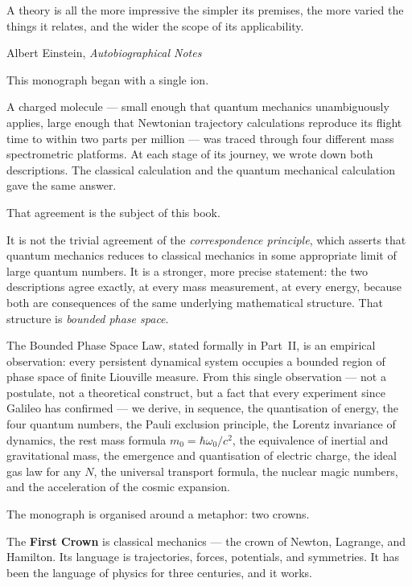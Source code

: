 
\epigraph{%
  A theory is all the more impressive the simpler its premises,
  the more varied the things it relates,
  and the wider the scope of its applicability.%
}{Albert Einstein, \textit{Autobiographical Notes}}

This monograph began with a single ion.

A charged molecule --- small enough that quantum mechanics unambiguously applies,
large enough that Newtonian trajectory calculations reproduce its flight time
to within two parts per million --- was traced through four different mass
spectrometric platforms.
At each stage of its journey, we wrote down both descriptions.
The classical calculation and the quantum mechanical calculation gave the same
answer.

That agreement is the subject of this book.

It is not the trivial agreement of the \emph{correspondence principle}, which
asserts that quantum mechanics reduces to classical mechanics in some appropriate
limit of large quantum numbers.
It is a stronger, more precise statement: the two descriptions agree exactly,
at every mass measurement, at every energy, because both are consequences of
the same underlying mathematical structure.
That structure is \emph{bounded phase space}.

The Bounded Phase Space Law, stated formally in Part~II, is an empirical
observation: every persistent dynamical system occupies a bounded region of
phase space of finite Liouville measure.
From this single observation --- not a postulate, not a theoretical construct,
but a fact that every experiment since Galileo has confirmed --- we derive, in
sequence, the quantisation of energy, the four quantum numbers, the Pauli
exclusion principle, the Lorentz invariance of dynamics, the rest mass formula
$m_0 = \hbar\omega_0/c^2$, the equivalence of inertial and gravitational mass,
the emergence and quantisation of electric charge, the ideal gas law for any $N$,
the universal transport formula, the nuclear magic numbers, and
the acceleration of the cosmic expansion.

The monograph is organised around a metaphor: two crowns.

The \textbf{First Crown} is classical mechanics --- the crown of Newton,
Lagrange, and Hamilton.
Its language is trajectories, forces, potentials, and symmetries.
It has been the language of physics for three centuries, and it works.

